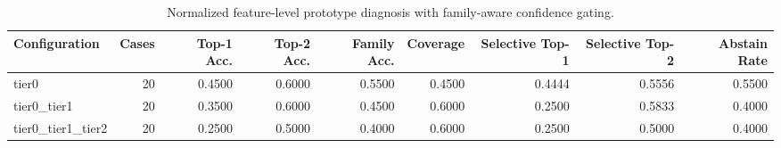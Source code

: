 \begin{table}[t]
\centering
\caption{Normalized feature-level prototype diagnosis with family-aware confidence gating.}
\label{tab:dice_stressor_hierarchical_diagnosis}
\footnotesize
\begin{tabular}{lrrrrrrrr}
\toprule
Configuration & Cases & Top-1 Acc. & Top-2 Acc. & Family Acc. & Coverage & Selective Top-1 & Selective Top-2 & Abstain Rate \\
\midrule
tier0 & 20 & 0.4500 & 0.6000 & 0.5500 & 0.4500 & 0.4444 & 0.5556 & 0.5500 \\
tier0_tier1 & 20 & 0.3500 & 0.6000 & 0.4500 & 0.6000 & 0.2500 & 0.5833 & 0.4000 \\
tier0_tier1_tier2 & 20 & 0.2500 & 0.5000 & 0.4000 & 0.6000 & 0.2500 & 0.5000 & 0.4000 \\
\bottomrule
\end{tabular}

\end{table}

